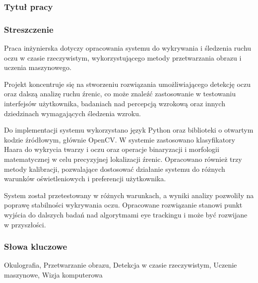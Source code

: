 \documentclass[a4paper,twoside,12pt]{book}
\begin{document}


\cleardoublepage

\rmfamily\normalfont
\pagestyle{empty}



%
%
%
\subsubsection*{Tytuł pracy} 
\Title

\subsubsection*{Streszczenie}  

Praca inżynierska dotyczy opracowania systemu do wykrywania i śledzenia ruchu oczu w czasie rzeczywistym, wykorzystującego metody przetwarzania obrazu i uczenia maszynowego.

Projekt koncentruje się na stworzeniu rozwiązania umożliwiającego detekcję oczu oraz dalszą analizę ruchu źrenic, co może znaleźć zastosowanie w testowaniu interfejsów użytkownika, badaniach nad percepcją wzrokową oraz innych dziedzinach wymagających śledzenia wzroku.

Do implementacji systemu wykorzystano język Python oraz biblioteki o otwartym kodzie źródłowym, głównie OpenCV. W systemie zastosowano klasyfikatory Haara do wykrycia twarzy i oczu oraz operacje binaryzacji i morfologii matematycznej w celu precyzyjnej lokalizacji źrenic. Opracowano również trzy metody kalibracji, pozwalające dostosować działanie systemu do różnych warunków oświetleniowych i preferencji użytkownika.

System został przetestowany w różnych warunkach, a wyniki analizy pozwoliły na poprawę stabilności wykrywania oczu. Opracowane rozwiązanie stanowi punkt wyjścia do dalszych badań nad algorytmami eye trackingu i może być rozwijane w przyszłości.

\subsubsection*{Słowa kluczowe} 
Okulografia, Przetwarzanie obrazu, Detekcja w czasie rzeczywistym, Uczenie maszynowe, Wizja komputerowa
\end{document}
